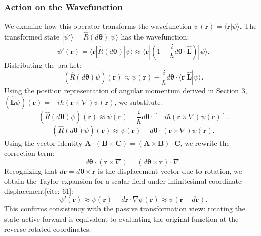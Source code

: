 \subsubsection{Action on the Wavefunction}
We examine how this operator transforms the wavefunction $\psi(\mathbf{r}) = \langle \mathbf{r} | \psi \rangle$. The transformed state $|\psi'\rangle = \hat{R}(d\boldsymbol{\theta})|\psi\rangle$ has the wavefunction:
\begin{equation}
    \psi'(\mathbf{r}) = \langle \mathbf{r} | \hat{R}(d\boldsymbol{\theta}) | \psi \rangle \approx \langle \mathbf{r} | \left( 1 - \frac{i}{\hbar} d\boldsymbol{\theta} \cdot \hat{\mathbf{L}} \right) | \psi \rangle.
\end{equation}
Distributing the bra-ket:
\begin{equation}
    (\hat{R}(d\boldsymbol{\theta})\psi)(\mathbf{r}) \approx \psi(\mathbf{r}) - \frac{i}{\hbar} d\boldsymbol{\theta} \cdot \langle \mathbf{r} | \hat{\mathbf{L}} | \psi \rangle.
\end{equation}
Using the position representation of angular momentum derived in Section 3, $(\hat{\mathbf{L}}\psi)(\mathbf{r}) = -i\hbar (\mathbf{r} \times \nabla)\psi(\mathbf{r})$, we substitute:
\begin{equation}
    (\hat{R}(d\boldsymbol{\theta})\psi)(\mathbf{r}) \approx \psi(\mathbf{r}) - \frac{i}{\hbar} d\boldsymbol{\theta} \cdot \left[ -i\hbar (\mathbf{r} \times \nabla) \psi(\mathbf{r}) \right].
\end{equation}
\begin{equation}
    (\hat{R}(d\boldsymbol{\theta})\psi)(\mathbf{r}) \approx \psi(\mathbf{r}) - d\boldsymbol{\theta} \cdot (\mathbf{r} \times \nabla) \psi(\mathbf{r}).
\end{equation}
Using the vector identity $\mathbf{A} \cdot (\mathbf{B} \times \mathbf{C}) = (\mathbf{A} \times \mathbf{B}) \cdot \mathbf{C}$, we rewrite the correction term:
\begin{equation}
    d\boldsymbol{\theta} \cdot (\mathbf{r} \times \nabla) = (d\boldsymbol{\theta} \times \mathbf{r}) \cdot \nabla.
\end{equation}
Recognizing that $d\mathbf{r} = d\boldsymbol{\theta} \times \mathbf{r}$ is the displacement vector due to rotation, we obtain the Taylor expansion for a scalar field under infinitesimal coordinate displacement[cite: 61]:
\begin{equation}
    \psi'(\mathbf{r}) \approx \psi(\mathbf{r}) - d\mathbf{r} \cdot \nabla \psi(\mathbf{r}) \approx \psi(\mathbf{r} - d\mathbf{r}).
\end{equation}
This confirms consistency with the passive transformation view: rotating the state active forward is equivalent to evaluating the original function at the reverse-rotated coordinates.

